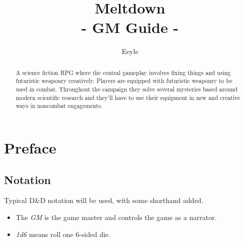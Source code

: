 \documentclass[a4paper]{article}
\title{Meltdown \\ {\large - GM Guide -}}
\author{Eeyle}
\date{}
\begin{document}
\maketitle

\begin{abstract}

A science fiction RPG where the central gameplay involves fixing things and using futuristic weaponry creatively. Players are equipped with futuristic weaponry to be used in combat. Throughout the campaign they solve several mysteries based around modern scientific research and they'll have to use their equipment in new and creative ways in noncombat engagements.


\end{abstract}

{
  \hypersetup{linkcolor=black}
  \setcounter{tocdepth}{2}
  \tableofcontents
}

\section{Preface} \label{preface}

\subsection{Notation} \label{preface_notation}
Typical D\&D notation will be used, with some shorthand added. 
\begin{itemize}
\item The \textit{GM} is the game master and controls the game as a narrator.
\item \textit{1d6} means roll one 6-sided die.
\end{itemize}
\end{document}
